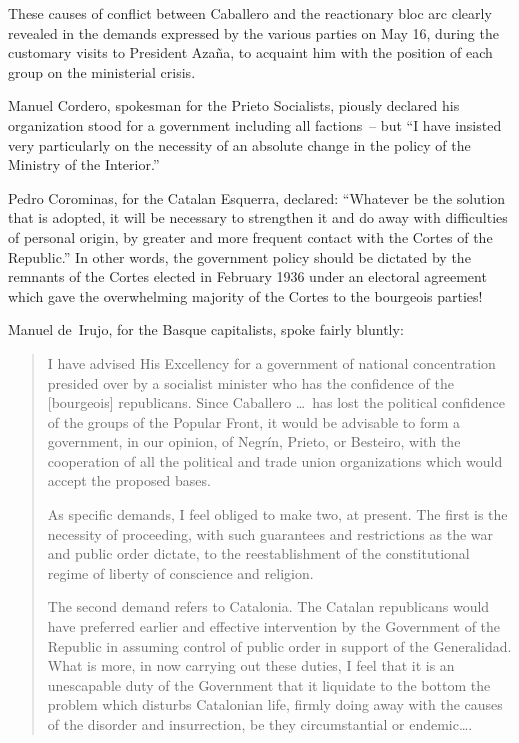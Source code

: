 \dinkus

These causes of conflict between Caballero and the reactionary bloc arc clearly revealed in the demands expressed by the various parties on May 16, during the customary visits to President Azaña, to acquaint him with the position of each group on the ministerial crisis.

Manuel Cordero, spokesman for the Prieto Socialists, piously declared his organization stood for a government including all factions~-- but ``I have insisted very particularly on the necessity of an absolute change in the policy of the Ministry of the Interior.\kn''

Pedro Corominas, for the Catalan Esquerra, declared: ``\kp Whatever be the solution that is adopted, it will be necessary to strengthen it and do away with difficulties of personal origin, by greater and more frequent contact with the Cortes of the Republic.\kn\kn'' In other words, the government policy should be dictated by the remnants of the Cortes elected in February 1936 under an electoral agreement which gave the overwhelming majority of the Cortes to the bourgeois parties!

\medskip

Manuel de~Irujo, for the Basque capitalists, spoke fairly bluntly:

\begin{quotation}
  I have advised His Excellency for a government of national concentration presided over by a socialist minister who has the confidence of the [bourgeois] republicans. Since Cab\-a\-llero \dots\ has lost the political confidence of the groups of the Popular Front, it would be advisable to form a government, in our opinion, of Negr\'in, Prieto, or Besteiro, with the cooperation of all the political and trade union organizations which would accept the proposed bases.
  
  As specific demands, I feel obliged to make two, at present. The first is the necessity of proceeding, with such guarantees and restrictions as the war and public order dictate, to the reestablishment of the constitutional regime of liberty of conscience and religion.
  
  The second demand refers to Catalonia. The Catalan republicans would have preferred earlier and effective intervention by the Government of the Republic in assuming control of public order in support of the Generalidad. What is more, in now carrying out these duties, I feel that it is an unescapable duty of the Government that it liquidate to the bottom the problem which disturbs Catalonian life, firmly doing away with the causes of the disorder and insurrection, be they circumstantial or endemic\dots.
\end{quotation}

